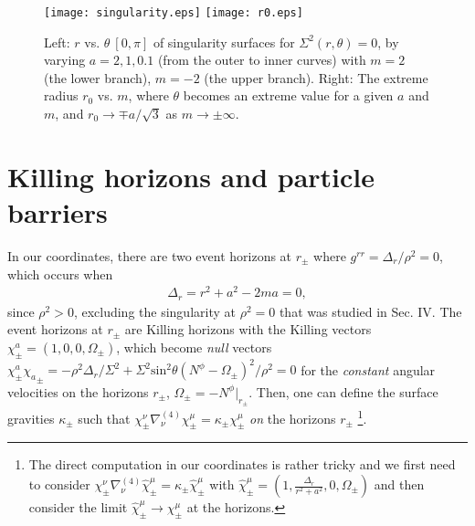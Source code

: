 \documentclass[preprint,aps,tightenlines,showkeys,nofootinbib,superscriptaddress]{revtex4}
\newcommand{\beq}{\begin{eqnarray}}
\newcommand{\eeq}{\end{eqnarray}}
\newcommand{\De}{\Delta}
\newcommand{\ka}{\kappa}
\newcommand{\Si}{{\Sigma}}
\newcommand{\Om}{{\Omega}}
\newcommand{\f}{\frac}
\newcommand{\ra}{\rightarrow}
\begin{document}
\begin{figure}
\texttt{[image: singularity.eps]}
\qquad
\texttt{[image: r0.eps]}
\caption{Left: $r$ vs. $\theta~ [0, \pi]$ of singularity surfaces for $\Si^2 (r, \theta)=0$, by varying $a=2,1,0.1$ (from the outer to inner curves) with $m=2$ (the lower branch), $m=-2$ (the upper branch). Right: The extreme radius $r_0$ vs. $m$, where $\theta$ becomes an extreme value for a given $a$ and $m$, and
$r_0
\ra \mp a/\sqrt{3}$ as $m \ra \pm \infty$.}\label{fig:singular}
\end{figure}

\section{Killing horizons and particle barriers}

In our coordinates, there are two event horizons at $r_{\pm}$ where $g^{rr}=\Delta_r/\rho^2=0$, which occurs when
\beq
\De_r =r^2+a^2-2ma=0,
\eeq
since $\rho^2 >0$, excluding the singularity at $\rho^2=0$ that was studied in Sec. IV. The event horizons at $r_{\pm}$ are Killing horizons with the Killing vectors $\chi^a_{\pm}=(1,0,0,\Om_{\pm})$, which become {\it null} vectors $\chi^a_{\pm} {\chi_a}_{\pm}=-\rho^2 \De_r/\Si^2+\Si^2 \mbox{sin}^2\theta (N^{\phi}-\Om_{\pm})^2/\rho^2=0$ for the {\it constant} angular velocities on the horizons $r_{\pm}$, $\Om_{\pm}=-N^{\phi}|_{r_{\pm}}$. Then, one can define the surface gravities $\ka_{\pm}$ such that $\chi^{\nu}_{\pm} \nabla_{\nu}^{(4)} \chi^{\mu}_{\pm}=\ka_{\pm} \chi^{\mu}_{\pm}$ {\it on} the horizons $r_{\pm}$ \footnote{The direct computation in our coordinates is rather tricky and we first need to consider $\chi^{\nu}_{\pm} \nabla_{\nu}^{(4)} \widehat{\chi}^{\mu}_{\pm}=\ka_{\pm} \widehat{\chi}^{\mu}_{\pm}$ with $\widehat{\chi}^{\mu}_{\pm}=(1,\f{\De_r}{r^2+a^2},0,\Om_{\pm})$ and then consider the limit $\widehat{\chi}^{\mu}_{\pm} \ra \chi^{\mu}_{\pm}$ at the horizons.}.
\end{document}
